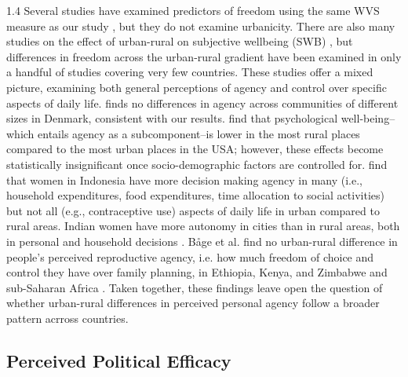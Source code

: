\documentclass[10pt, letterpaper]{article}
\begin{document}
\begin{spacing}{1.4}
Several studies have examined predictors of freedom using the same WVS measure as our study 
\citep[e.g.,][]{aok_free_from_to,pitlik2016free,nikolaev2016give}, but they do not examine urbanicity. There are also many studies on the effect of urban-rural on subjective wellbeing (SWB)
\citep[e.g.,][]{sorensen24,sorensen14,knies26,aok21}, but differences in freedom across the urban-rural gradient have been examined in only a handful of studies covering very few countries. These studies offer a mixed picture, examining both general perceptions of agency and control over specific aspects of daily life. \citet{lolle2023differences} finds no differences in agency across communities of different sizes in Denmark, consistent with our results. 
\citet{atherton2024rural} find that psychological well-being--which entails agency as a subcomponent--is lower in the most rural places compared to the most urban places in the USA; however, these effects become statistically insignificant once socio-demographic factors are controlled for. 
\citet{kusnali2025rural} find that women in Indonesia have more decision making agency in many (i.e., household expenditures, food expenditures, time allocation to social activities) but not all (e.g., contraceptive use) aspects of daily life in urban compared to rural areas. Indian women have more autonomy in cities than in rural areas, both in personal and household decisions \citep{mishra2014relative}. 
B\r{a}ge et al. find no urban-rural difference in people's
perceived reproductive agency, i.e. how much freedom of choice and control they have over family planning, in Ethiopia, Kenya, and Zimbabwe \citep{baage2024attitudes} and sub-Saharan Africa \citep{baage2026reproductive}.
Taken together, these findings leave open the question of whether urban-rural differences in perceived personal agency follow a broader pattern acrross countries. 
 
\subsection{Perceived Political Efficacy}

 

\end{spacing}
\end{document}
